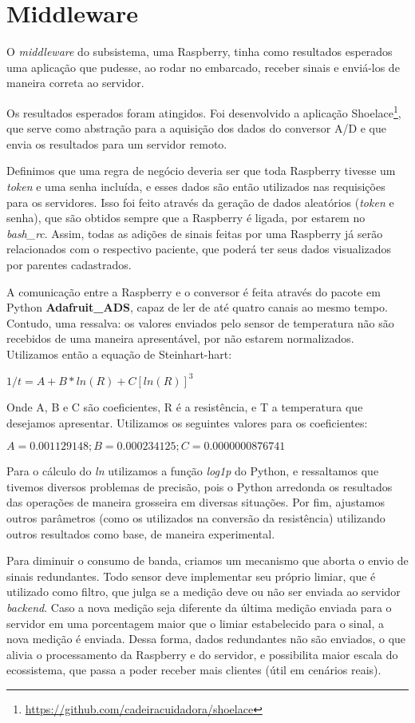 \section{Middleware}

O \textit{middleware} do subsistema, uma Raspberry, tinha como resultados
esperados uma aplicação que pudesse, ao rodar no embarcado, receber sinais e
enviá-los de maneira correta ao servidor.

Os resultados esperados foram atingidos. Foi desenvolvido a aplicação
Shoelace\footnote{\url{https://github.com/cadeiracuidadora/shoelace}}, que
serve como abstração para a aquisição dos dados do conversor A/D e que envia
os resultados para um servidor remoto.

Definimos que uma regra de negócio deveria ser que toda Raspberry tivesse
um \textit{token} e uma senha incluída, e esses dados são então utilizados nas
requisições para os servidores. Isso foi feito através da geração de dados
aleatórios (\textit{token} e senha), que são obtidos sempre que a Raspberry
é ligada, por estarem no \textit{bash\_rc}. Assim, todas as adições de sinais
feitas por uma Raspberry já serão relacionados com o respectivo paciente,
que poderá ter seus dados visualizados por parentes cadastrados.

A comunicação entre a Raspberry e o conversor é feita através do pacote em
Python \textbf{Adafruit\_ADS}, capaz de ler de até quatro canais ao mesmo tempo.
Contudo, uma ressalva: os valores enviados pelo sensor de temperatura não são
recebidos de uma maneira apresentável, por não estarem normalizados. Utilizamos
então a equação de Steinhart-hart:

$ 1/t = A + B * ln(R) + C[ln(R)]^3 $

Onde A, B e C são coeficientes, R é a resistência, e T a temperatura que
desejamos apresentar. Utilizamos os seguintes valores para os coeficientes:

$ A = 0.001129148; B = 0.000234125 ; C =  0.0000000876741 $

Para o cálculo do \textit{ln} utilizamos a função \textit{log1p} do Python, e
ressaltamos que tivemos diversos problemas de precisão, pois o Python arredonda
os resultados das operações de maneira grosseira em diversas situações. Por
fim, ajustamos outros parâmetros (como os utilizados na conversão da
resistência) utilizando outros resultados como base, de maneira experimental.

Para diminuir o consumo de banda, criamos um mecanismo que aborta o envio de
sinais redundantes. Todo sensor deve implementar seu próprio limiar, que é
utilizado como filtro, que julga se a medição deve ou não ser enviada ao
servidor \textit{backend}. Caso a nova medição seja diferente da última
medição enviada para o servidor em uma porcentagem maior que o limiar
estabelecido para o sinal, a nova medição é enviada. Dessa forma, dados
redundantes não são enviados, o que alivia o processamento da Raspberry e do
servidor, e possibilita maior escala do ecossistema, que passa a poder receber
mais clientes (útil em cenários reais).

